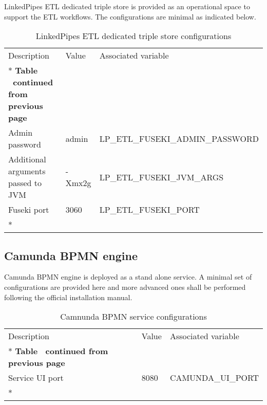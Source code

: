 	LinkedPipes ETL dedicated triple store is provided as an operational space to support the ETL workflows. The configurations are minimal as indicated below. 
	
	\begin{longtable}[c]{@{}p{4cm}p{2cm}l@{}}
		\toprule
		Description & Value & Associated variable \\* \midrule
		\endfirsthead
		\multicolumn{3}{c}%
		{{\bfseries Table \thetable\ continued from previous page}} \\
		\endhead
		\bottomrule
		\endfoot
		\endlastfoot
		Admin password & admin & LP\_ETL\_FUSEKI\_ADMIN\_PASSWORD \\
		Additional arguments passed to JVM & -Xmx2g & LP\_ETL\_FUSEKI\_JVM\_ARGS \\
		Fuseki port & 3060 & LP\_ETL\_FUSEKI\_PORT \\* \bottomrule
		\caption{LinkedPipes ETL dedicated triple store configurations}
		\label{tab:my-table6}\\
	\end{longtable}
	
	\subsection{Camunda BPMN engine}

	Camunda BPMN engine is deployed as a stand alone service.  A minimal set of configurations are provided here and more advanced ones shall be performed following the official installation manual. 
	
 	\begin{longtable}[c]{@{}p{4cm}p{2cm}l@{}}
	 	\toprule
	 	Description & Value & Associated variable \\* \midrule
	 	\endfirsthead
	 	\multicolumn{3}{c}%
	 	{{\bfseries Table \thetable\ continued from previous page}} \\
	 	\endhead
	 	\bottomrule
	 	\endfoot
	 	\endlastfoot
	 	Service UI port & 8080 & CAMUNDA\_UI\_PORT \\* \bottomrule
	 	\caption{Camnunda BPMN service configurations}
	 	\label{tab:my-table9}\\
	 \end{longtable}
	
	